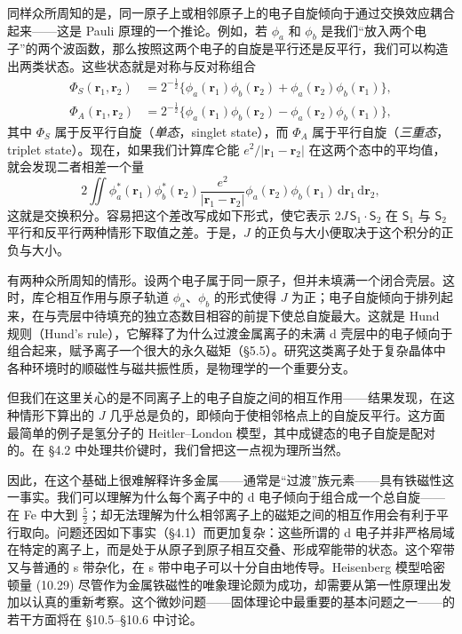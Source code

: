 同样众所周知的是，同一原子上或相邻原子上的电子自旋倾向于通过交换效应耦合起来——这是 Pauli 原理的一个推论。例如，若 $\phi_{a}$ 和 $\phi_{b}$ 是我们“放入两个电子”的两个波函数，那么按照这两个电子的自旋是平行还是反平行，我们可以构造出两类状态。这些状态就是对称与反对称组合
\begin{align*}
\Phi_{S}(\mathbf{r}_{1},\mathbf{r}_{2})&=2^{-\frac{1}{2}}\bigl\{\phi_{a}(\mathbf{r}_{1})\phi_{b}(\mathbf{r}_{2})+\phi_{a}(\mathbf{r}_{2})\phi_{b}(\mathbf{r}_{1})\bigr\},\\
\Phi_{A}(\mathbf{r}_{1},\mathbf{r}_{2})&=2^{-\frac{1}{2}}\bigl\{\phi_{a}(\mathbf{r}_{1})\phi_{b}(\mathbf{r}_{2})-\phi_{a}(\mathbf{r}_{2})\phi_{b}(\mathbf{r}_{1})\bigr\},
\tag{10.36}
\end{align*}
其中 $\Phi_{S}$ 属于反平行自旋（\emph{单态}，singlet state），而 $\Phi_{A}$ 属于平行自旋（\emph{三重态}，triplet state）。现在，如果我们计算库仑能 $e^{2}/|\mathbf{r}_{1}-\mathbf{r}_{2}|$ 在这两个态中的平均值，就会发现二者相差一个量
\begin{equation*}
2\iint\phi_{a}^{*}(\mathbf{r}_{1})\phi_{b}^{*}(\mathbf{r}_{2})\frac{e^{2}}{|\mathbf{r}_{1}-\mathbf{r}_{2}|}\phi_{a}(\mathbf{r}_{2})\phi_{b}(\mathbf{r}_{1})\,\mathrm{d}\mathbf{r}_{1}\,\mathrm{d}\mathbf{r}_{2},
\tag{10.37}
\end{equation*}
这就是交换积分。容易把这个差改写成如下形式，使它表示 $2J\,\boldsymbol{\mathsf{S}}_{1}\cdot\boldsymbol{\mathsf{S}}_{2}$ 在 $\boldsymbol{\mathsf{S}}_{1}$ 与 $\boldsymbol{\mathsf{S}}_{2}$ 平行和反平行两种情形下取值之差。于是，$J$ 的正负与大小便取决于这个积分的正负与大小。

有两种众所周知的情形。设两个电子属于同一原子，但并未填满一个闭合壳层。这时，库仑相互作用与原子轨道 $\phi_{a}$、$\phi_{b}$ 的形式使得 $J$ 为正；电子自旋倾向于排列起来，在与壳层中待填充的独立态数目相容的前提下使总自旋最大。这就是 Hund 规则（Hund's rule），它解释了为什么过渡金属离子的未满 d 壳层中的电子倾向于组合起来，赋予离子一个很大的永久磁矩（§5.5）。研究这类离子处于复杂晶体中各种环境时的顺磁性与磁共振性质，是物理学的一个重要分支。

但我们在这里关心的是不同离子上的电子自旋之间的相互作用——结果发现，在这种情形下算出的 $J$ 几乎总是负的，即倾向于使相邻格点上的自旋反平行。这方面最简单的例子是氢分子的 Heitler–London 模型，其中成键态的电子自旋是配对的。在 §4.2 中处理共价键时，我们曾把这一点视为理所当然。

因此，在这个基础上很难解释许多金属——通常是“过渡”族元素——具有铁磁性这一事实。我们可以理解为什么每个离子中的 d 电子倾向于组合成一个总自旋——在 Fe 中大到 $\frac{5}{2}$；却无法理解为什么相邻离子上的磁矩之间的相互作用会有利于平行取向。问题还因如下事实（§4.1）而更加复杂：这些所谓的 d 电子并非严格局域在特定的离子上，而是处于从原子到原子相互交叠、形成窄能带的状态。这个窄带又与普通的 s 带杂化，在 s 带中电子可以十分自由地传导。Heisenberg 模型哈密顿量 (10.29) 尽管作为金属铁磁性的唯象理论颇为成功，却需要从第一性原理出发加以认真的重新考察。这个微妙问题——固体理论中最重要的基本问题之一——的若干方面将在 §10.5–§10.6 中讨论。

